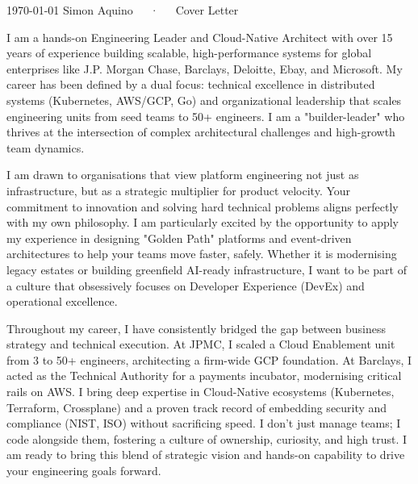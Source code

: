 \documentclass[12pt, a4paper]{awesome-cv}
\begin{document}
\makecvheader[R]

\makecvfooter
{\today}
{Simon Aquino~~~·~~~Cover Letter}
{}

\makelettertitle

\begin{cvletter}

  I am a hands-on Engineering Leader and Cloud-Native Architect with over 15 years of experience
  building scalable, high-performance systems for global enterprises like J.P. Morgan Chase, Barclays,
  Deloitte, Ebay, and Microsoft. My career has been defined by a dual focus: technical excellence
  in distributed systems (Kubernetes, AWS/GCP, Go) and organizational leadership that scales engineering
  units from seed teams to 50+ engineers. I am a "builder-leader" who thrives at the intersection of
  complex architectural challenges and high-growth team dynamics.

  I am drawn to organisations that view platform engineering not just as infrastructure, but as a strategic
  multiplier for product velocity. Your commitment to innovation and solving hard technical
  problems aligns perfectly with my own philosophy. I am particularly excited by the opportunity
  to apply my experience in designing "Golden Path" platforms and event-driven architectures to
  help your teams move faster, safely. Whether it is modernising legacy estates or building
  greenfield AI-ready infrastructure, I want to be part of a culture that obsessively focuses on
  Developer Experience (DevEx) and operational excellence.

  Throughout my career, I have consistently bridged the gap between business strategy and technical
  execution. At JPMC, I scaled a Cloud Enablement unit from 3 to 50+ engineers, architecting a
  firm-wide GCP foundation. At Barclays, I acted as the Technical Authority for a payments incubator,
  modernising critical rails on AWS. I bring deep expertise in Cloud-Native ecosystems (Kubernetes,
  Terraform, Crossplane) and a proven track record of embedding security and compliance (NIST, ISO)
  without sacrificing speed. I don't just manage teams; I code alongside them, fostering a culture of
  ownership, curiosity, and high trust. I am ready to bring this blend of strategic vision and hands-on
  capability to drive your engineering goals forward.

\end{cvletter}


\makeletterclosing
\end{document}
